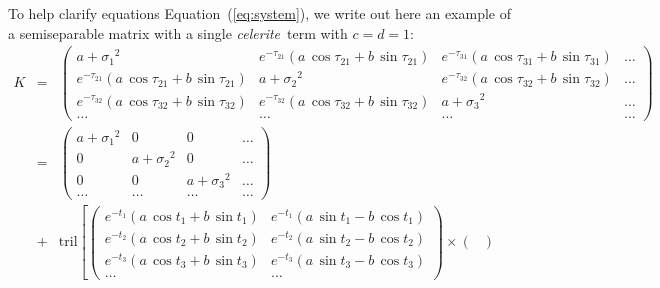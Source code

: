 \documentclass[manuscript, letterpaper]{aastex6}
\newcommand{\celeriteterm}{\emph{celerite}}
\renewcommand{\eqref}[1]{\ref{eq:#1}}
\newcommand{\Eq}[1]{Equation~(\eqref{#1})}
\newcommand{\eq}[1]{\Eq{#1}}
\newcommand{\eqlabel}[1]{\label{eq:#1}}
\begin{document}
To help clarify equations \eq{system}, we write out here an example of a semiseparable matrix with a
single \celeriteterm\ term with $c=d=1$:
\begin{eqnarray}\eqlabel{semi-separable-structure}
K&=&%
\begin{pmatrix}
    {\scriptscriptstyle a+{\sigma_1}^2 }& {\scriptscriptstyle e^{-\tau_{21}}\left(a\,\cos{\tau_{21}}+b\,\sin{\tau_{21}}\right)} & {\scriptscriptstyle e^{-\tau_{31}}\left(a\,\cos{\tau_{31}}+b\,\sin{\tau_{31}}\right)} & \ldots\\
    {\scriptscriptstyle e^{-\tau_{21}}\left(a\,\cos{\tau_{21}}+b\,\sin{\tau_{21}}\right)}&{\scriptscriptstyle a+{\sigma_2}^2 }& {\scriptscriptstyle e^{-\tau_{32}}\left(a\,\cos{\tau_{32}}+b\,\sin{\tau_{32}}\right)} & \ldots\\
    {\scriptscriptstyle e^{-\tau_{32}}\left(a\,\cos{\tau_{32}}+b\,\sin{\tau_{32}}\right)}&{\scriptscriptstyle  e^{-\tau_{32}}\left(a\,\cos{\tau_{32}}+b\,\sin{\tau_{32}}\right)} & \scriptscriptstyle{a + {\sigma_3}^2} & \ldots \\
    \ldots & \ldots & \ldots & \ldots
\end{pmatrix}\\
&=&
\begin{pmatrix}
    {\scriptscriptstyle a+{\sigma_1}^2} & {\scriptscriptstyle 0} & {\scriptscriptstyle 0} & \ldots\\
    {\scriptscriptstyle 0} & {\scriptscriptstyle a+{\sigma_2}^2 }& {\scriptscriptstyle 0} & \ldots\\
    {\scriptscriptstyle 0} & {\scriptscriptstyle 0} & {\scriptscriptstyle a + {\sigma_3}^2} & \ldots\\
    \ldots & \ldots & \ldots & \ldots
\end{pmatrix}\\
&+&\mathrm{tril}\left[\begin{pmatrix}
    {\scriptscriptstyle e^{-t_1}\left(a\,\cos{t_1}+b\,\sin{t_1}\right)}&
    {\scriptscriptstyle e^{-t_1}\left(a\,\sin{t_1}-b\,\cos{t_1}\right)}\\
    {\scriptscriptstyle e^{-t_2}\left(a\,\cos{t_2}+b\,\sin{t_2}\right)}&
    {\scriptscriptstyle e^{-t_2}\left(a\,\sin{t_2}-b\,\cos{t_2}\right)}\\
    {\scriptscriptstyle e^{-t_3}\left(a\,\cos{t_3}+b\,\sin{t_3}\right)}&
    {\scriptscriptstyle e^{-t_3}\left(a\,\sin{t_3}-b\,\cos{t_3}\right)}\\
   \ldots & \ldots
\end{pmatrix}
\times
\begin{pmatrix}

\end{pmatrix}
\end{eqnarray}
\end{document}
